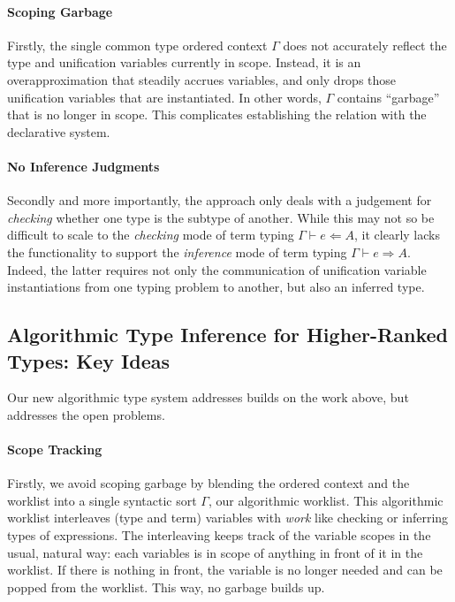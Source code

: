 \paragraph{Scoping Garbage} Firstly, the single common type ordered context 
$\Gamma$ does not accurately reflect the type and unification variables
currently in scope. Instead, it is an overapproximation that steadily accrues
variables, and only drops those unification variables that are instantiated.
In other words, $\Gamma$ contains ``garbage'' that is no longer in scope.
This complicates establishing the relation with the declarative system.


\paragraph{No Inference Judgments} 
Secondly and more importantly, the approach only deals with a judgement for
\emph{checking} whether one type is the subtype of another. While this may not
so be difficult to scale to the \emph{checking} mode of term typing $\Gamma
\vdash e \Leftarrow A$, it clearly lacks the functionality to support the
\emph{inference} mode of term typing $\Gamma \vdash e \Rightarrow A$. Indeed,
the latter requires not only the communication of unification variable
instantiations from one typing problem to another, but also an inferred type.

\subsection{Algorithmic Type Inference for Higher-Ranked Types: Key Ideas}

Our new algorithmic type system addresses builds on the work above, but
addresses the open problems. 

\paragraph{Scope Tracking}
Firstly, we avoid scoping garbage by blending the ordered context and the
worklist into a single syntactic sort $\Gamma$, our algorithmic worklist. This
algorithmic worklist interleaves (type and term) variables with \emph{work}
like checking or inferring types of expressions. The interleaving keeps track
of the variable scopes in the usual, natural way: each variables is in scope of
anything in front of it in the worklist. If there is nothing in front, the
variable is no longer needed and can be popped from the worklist. This way, no
garbage builds up.

